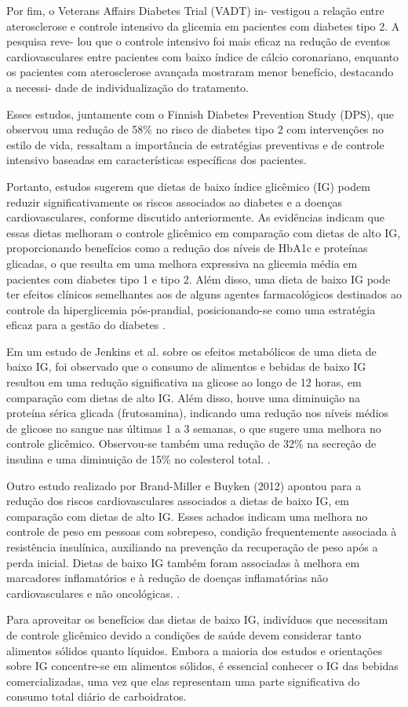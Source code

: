 \documentclass[conference]{IEEEtran}
\begin{document}
Por fim, o Veterans Affairs Diabetes Trial (VADT) in-
vestigou a relação entre aterosclerose e controle intensivo da 
glicemia em pacientes com diabetes tipo 2. A pesquisa reve-
lou que o controle intensivo foi mais eficaz na redução de 
eventos cardiovasculares entre pacientes com baixo índice de 
cálcio coronariano, enquanto os pacientes com aterosclerose 
avançada mostraram menor benefício, destacando a necessi-
dade de individualização do tratamento\cite{b19}. 
\par
Esses estudos, juntamente com o Finnish Diabetes Prevention Study (DPS), 
que observou uma redução de 58\% no risco de
diabetes tipo 2 com intervenções no estilo de vida, ressaltam a importância de estratégias preventivas e de controle
intensivo baseadas em características específicas dos pacientes\cite{b23}.
\par
Portanto, estudos sugerem que dietas de baixo índice glicêmico (IG) podem reduzir significativamente os riscos associados
ao diabetes e a doenças cardiovasculares, conforme discutido anteriormente. As evidências indicam que essas dietas melhoram
o controle glicêmico em comparação com dietas de alto IG, proporcionando benefícios como a redução dos níveis de HbA1c e
proteínas glicadas, o que resulta em uma melhora expressiva na glicemia média em pacientes com diabetes tipo 1 e tipo 2.
Além disso, uma dieta de baixo IG pode ter efeitos clínicos semelhantes aos de alguns agentes farmacológicos destinados ao
controle da hiperglicemia pós-prandial, posicionando-se como uma estratégia eficaz para a gestão do diabetes \cite{b37}.
\par
Em um estudo de Jenkins et al. sobre os efeitos metabólicos de uma dieta de baixo IG, foi observado que o consumo de
alimentos e bebidas de baixo IG resultou em uma redução significativa na glicose ao longo de 12 horas, em comparação com
dietas de alto IG. Além disso, houve uma diminuição na proteína sérica glicada (frutosamina), indicando uma redução nos
níveis médios de glicose no sangue nas últimas 1 a 3 semanas, o que sugere uma melhora no controle glicêmico. Observou-se
também uma redução de 32\% na secreção de insulina e uma diminuição de 15\% no colesterol total. \cite{b38}.
\par
Outro estudo realizado por Brand-Miller e Buyken (2012) apontou para a redução dos riscos cardiovasculares associados a
dietas de baixo IG, em comparação com dietas de alto IG. Esses achados indicam uma melhora no controle de peso em pessoas
com sobrepeso, condição frequentemente associada à resistência insulínica, auxiliando na prevenção da recuperação de peso
após a perda inicial. Dietas de baixo IG também foram associadas à melhora em marcadores inflamatórios e à redução de
doenças inflamatórias não cardiovasculares e não oncológicas. \cite{b39}.
\par
Para aproveitar os benefícios das dietas de baixo IG, indivíduos que
necessitam de controle glicêmico devido a condições de
saúde devem considerar tanto alimentos sólidos quanto líquidos. Embora a
maioria dos estudos e orientações sobre IG
concentre-se em alimentos sólidos, é essencial conhecer o IG das bebidas
comercializadas, uma vez que elas representam uma
parte significativa do consumo total diário de carboidratos.
\fussy
\end{document}
